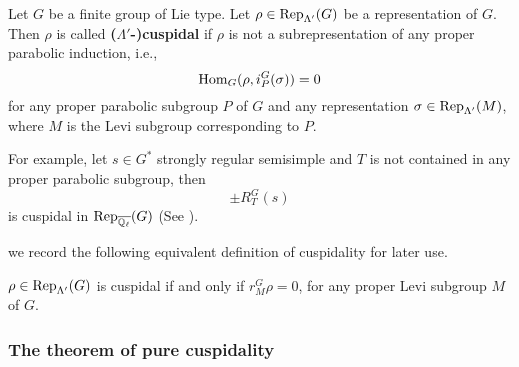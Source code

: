 	\begin{definition}[Cuspidal]\label{Def Cuspidal}
		Let $G$ be a finite group of Lie type. Let $\rho \in \operatorname{\operatorname{Rep}}_{\Lambda'}(G)$ be a representation of $G$. Then $\rho$ is called \textbf{($\Lambda'$-)cuspidal} if $\rho$ is not a subrepresentation of any proper parabolic induction, i.e., 
		$$\operatorname{\operatorname{Hom}}_{G}(\rho, i_P^G(\sigma))=0$$ 
		for any proper parabolic subgroup $P$ of $G$ and any representation $\sigma \in \operatorname{\operatorname{Rep}}_{\Lambda'}(M)$, where $M$ is the Levi subgroup corresponding to $P$.
	\end{definition}
	
	For example, let $s \in G^*$ strongly regular semisimple and $T$ is not contained in any proper parabolic subgroup, then 
	$$\pm R_T^G(\hat{s})$$ 
	is cuspidal in $\operatorname{\operatorname{Rep}}_{\overline{\mathbb{Q}_{\ell}}}(G)$ (See \cite[Theorem 8.3]{deligne1976representations}). 
	
	we record the following equivalent definition of cuspidality for later use.
	
	\begin{lemma}\cite[II.2.3]{vigneras1996representations}\label{Lemma Cuspidal}
		$\rho \in \operatorname{\operatorname{Rep}}_{\Lambda'}(G)$ is cuspidal if and only if $r_M^G\rho=0$, for any proper Levi subgroup $M$ of $G$.
	\end{lemma}
	
%	
	
	

	
	
	\subsubsection{The theorem of pure cuspidality}
	
